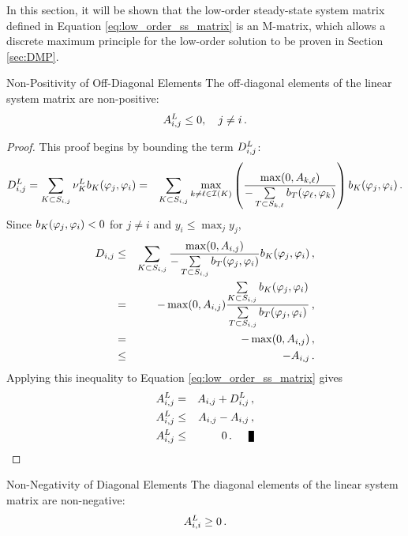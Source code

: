 In this section, it will be shown that the low-order steady-state system matrix
defined in Equation \eqref{eq:low_order_ss_matrix} is an M-matrix, which allows
a discrete maximum principle for the low-order solution to be proven in Section
\ref{sec:DMP}.
\begin{lemma}{Non-Positivity of Off-Diagonal Elements}
   The off-diagonal elements of the linear system matrix are non-positive:
   \[
     A^L_{i,j}\le 0, \quad j\ne i \,.
   \]
\end{lemma}

\begin{proof}
This proof begins by bounding the term $D_{i,j}^L$:
\begin{eqnarray*}
   \diffusionmatrixletter\ij^L=\sumKSij\lowordercellviscosity
   \localviscbilinearform{\cell}{j}{i}
   & = & \sumKSij\max\limits_{k\ne \ell\in \indicescell}
     \pr{\frac{\max(0,\ssmatrixletter_{k,\ell})}
       {-\sum\limits_{T\subset \support_{k,\ell}}
       \localviscbilinearform{T}{\ell}{k}}}
     \localviscbilinearform{\cell}{j}{i} \eqp
\end{eqnarray*}
Since $b_K(\varphi_j, \varphi_i) < 0$ for $j\ne i$ and $y_i \leq
\max_j y_j$,
\begin{eqnarray*}
   D_{i,j} & \le & \sum\limits_{K\subset S_{i,j}} \frac{\max(0,A_{i,j})}
   {-\sum\limits_{T\subset S_{i,j}} b_T(\varphi_j, \varphi_i)}
   b_K(\varphi_j, \varphi_i) \,,\\
   &  =  & -\max(0,A_{i,j})
     \frac{\sum\limits_{K\subset S_{i,j}}b_K(\varphi_j, \varphi_i)}
     {\sum\limits_{T\subset S_{i,j}} b_T(\varphi_j, \varphi_i)} \,,\\
   &  =  & -\max(0,A_{i,j}) \,,\\
   & \le & -A_{i,j} \,.
\end{eqnarray*}
Applying this inequality to Equation \eqref{eq:low_order_ss_matrix} gives
\begin{eqnarray*}
  \ssmatrixletter^L\ij &  =  & \ssmatrixletter\ij + \diffusionmatrixletter\ij^L
    \eqc\\
  \ssmatrixletter^L\ij & \le & \ssmatrixletter\ij - \ssmatrixletter\ij
    \eqc\\
  \ssmatrixletter^L\ij & \le & 0 \eqp \qed
\end{eqnarray*}
\end{proof}
\begin{lemma}{Non-Negativity of Diagonal Elements}
   The diagonal elements  of the linear system matrix are non-negative:
   \[
     A^L_{i,i}\ge 0 \,.
   \]
\end{lemma}

